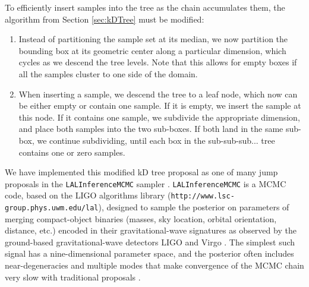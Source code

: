\documentclass{rsos}
\newcommand{\Nbox}{N_\mathrm{box}}
\newcommand{\ilya}[1]{{\color{red} \bf #1}}
\newcommand{\dan}[1]{{\color{magenta} \bf #1}}
\newcommand{\order}[1]{\mathcal{O}\left( #1 \right)}
\begin{document}
To efficiently insert samples into the tree as the chain accumulates them,
the algorithm from Section \ref{sec:kDTree} must be modified:
\begin{enumerate}
\item Instead of partitioning the sample set at its median, we now
  partition the bounding box at its geometric center along a
  particular dimension, which cycles as we descend the tree levels.
  Note that this allows for empty boxes if all the samples cluster to
  one side of the domain.
\item When inserting a sample, we descend the tree to a leaf node,
  which now can be either empty or contain one sample.  If it is empty,
  we insert the sample at this node.  If it contains one sample, we
  subdivide the appropriate dimension, and place both samples into the
  two sub-boxes.  If both land in the same sub-box, we continue
  subdividing, until each box in the sub-sub-sub... tree contains one
  or zero samples.
\end{enumerate}

We have implemented this modified kD tree proposal as one of many jump
proposals in the \texttt{LALInferenceMCMC} sampler
\cite{vanderSluys:2008a,Raymond:2010,Raymond2012,Veitch:2014}.
\texttt{LALInferenceMCMC} is a MCMC code, based on the LIGO algorithms
library ({\tt http://www.lsc-group.phys.uwm.edu/lal}), designed to sample the posterior on parameters of merging
compact-object binaries (masses, sky location, orbital orientation, distance, etc.) 
encoded in their gravitational-wave signatures as observed by the ground-based
gravitational-wave detectors LIGO \cite{AdvLIGO} and Virgo \cite{AdvVirgo}.  The simplest such
signal has a nine-dimensional parameter space, and the posterior often
includes near-degeneracies and multiple modes that make convergence of
the MCMC chain very slow with traditional proposals \cite{S6PE}.  
\end{document}

